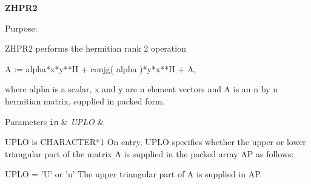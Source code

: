 {\bfseries Z\+H\+P\+R2} 

\begin{DoxyParagraph}{Purpose\+: }
\begin{DoxyVerb} ZHPR2  performs the hermitian rank 2 operation

    A := alpha*x*y**H + conjg( alpha )*y*x**H + A,

 where alpha is a scalar, x and y are n element vectors and A is an
 n by n hermitian matrix, supplied in packed form.\end{DoxyVerb}
 
\end{DoxyParagraph}

\begin{DoxyParams}[1]{Parameters}
\mbox{\tt in}  & {\em U\+P\+L\+O} & \begin{DoxyVerb}          UPLO is CHARACTER*1
           On entry, UPLO specifies whether the upper or lower
           triangular part of the matrix A is supplied in the packed
           array AP as follows:

              UPLO = 'U' or 'u'   The upper triangular part of A is
                                  supplied in AP.


\end{DoxyVerb}
\end{DoxyParams}
